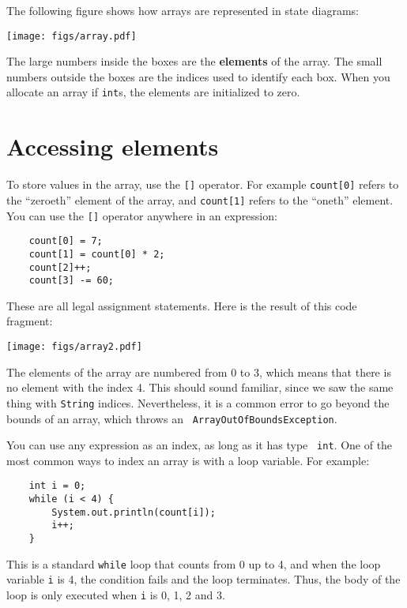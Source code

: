 \documentclass[12pt]{book}
\theoremstyle{definition}
\begin{document}

The following figure shows how arrays are represented in state
diagrams:


\texttt{[image: figs/array.pdf]}


The large numbers inside the boxes are the {\bf elements} of
the array.  The small numbers outside the boxes are the
indices used to identify each box.  When you allocate an
array if {\tt int}s, the elements are initialized to zero.


\section{Accessing elements}

To store values in the array, use the
{\tt []} operator.  For example {\tt count[0]} refers to the
``zeroeth'' element of the array, and {\tt count[1]} refers to the
``oneth'' element.  You can use the {\tt []} operator anywhere in an
expression:

\begin{lstlisting}
    count[0] = 7;
    count[1] = count[0] * 2;
    count[2]++;
    count[3] -= 60;
\end{lstlisting}
%
These are all legal assignment statements.  Here is the
result of this code fragment:


\texttt{[image: figs/array2.pdf]}


The elements of the array
are numbered from 0 to 3, which means that there is no element with
the index 4.  This should sound familiar, since we saw the same thing
with {\tt String} indices.  Nevertheless, it is a common error to go
beyond the bounds of an array, which throws an {\tt
ArrayOutOfBoundsException}.

You can use any expression as an index, as long as it has type {\tt
int}.  One of the most common ways to index an array is with a loop
variable.  For example:

\begin{lstlisting}
    int i = 0;
    while (i < 4) {
        System.out.println(count[i]);
        i++;
    }
\end{lstlisting}
%
This is a standard {\tt while} loop that counts from 0
up to 4, and when the loop variable {\tt i} is 4, the
condition fails and the loop terminates.  Thus, the body
of the loop is only executed when {\tt i} is 0, 1, 2 and 3.
\end{document}
